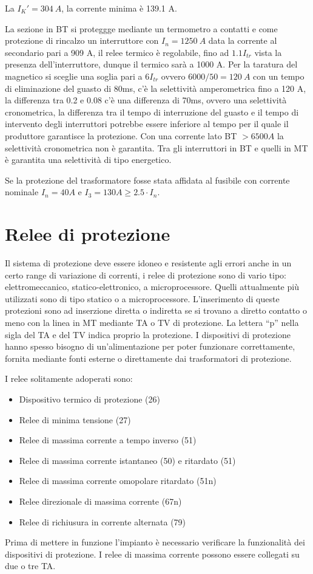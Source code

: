 La $I_K' = 304\ A$, la corrente minima è 139.1 A.


La sezione in BT si proteggge mediante un termometro a contatti e come protezione di rincalzo un interruttore con $I_n = 1250\ A$ data la corrente al secondario pari a 909 A, il relee termico è regolabile, fino ad $1.1I_{tr}$ vista la presenza dell'interruttore, dunque il termico sarà a 1000 A.
Per la taratura del magnetico si sceglie una soglia pari a $6I_{tr}$ ovvero $6000/50 = 120\ A$ con un tempo di eliminazione del guasto di 80ms, c'è la selettività amperometrica fino a 120 A, la differenza tra 0.2 e 0.08 c'è una differenza di 70ms, ovvero una selettività cronometrica, la differenza tra il tempo di interruzione del guasto e il tempo di intervento degli interruttori potrebbe essere inferiore al tempo per il quale il produttore garantisce la protezione. Con una corrente lato BT $> 6500 A$ la selettività cronometrica non è garantita.
Tra gli interruttori in BT e quelli in MT è garantita una selettività di tipo energetico. 

Se la protezione del trasformatore fosse stata affidata al fusibile con corrente nominale $I_n = 40 A$ e $I_3 = 130A \geq 2.5\cdot I_n$.

\section{Relee di protezione}
Il sistema di protezione deve essere idoneo e resistente agli errori anche in un certo range di variazione di correnti, i relee di protezione sono di vario tipo: elettromeccanico, statico-elettronico, a microprocessore.
Quelli attualmente più utilizzati sono di tipo statico o a microprocessore.
L'inserimento di queste protezioni sono ad inserzione diretta o indiretta se si trovano a diretto contatto o meno con la linea in MT mediante TA o TV di protezione. La lettera ``p'' nella sigla del TA e del TV indica proprio la protezione.
I dispositivi di protezione hanno spesso bisogno di un'alimentazione per poter funzionare correttamente, fornita mediante fonti esterne o direttamente dai trasformatori di protezione.

I relee solitamente adoperati sono:
\begin{itemize}
    \item Dispositivo termico di protezione (26)
    \item Relee di minima tensione (27)
    \item Relee di massima corrente a tempo inverso (51)
    \item Relee di massima corrente istantaneo (50) e ritardato (51)
    \item Relee di massima corrente omopolare ritardato (51n)
    \item Relee direzionale di massima corrente (67n)
    \item Relee di richiusura in corrente alternata (79) 
\end{itemize}
Prima di mettere in funzione l'impianto è necessario verificare la funzionalità dei dispositivi di protezione.
I relee di massima corrente possono essere collegati su due o tre TA.

